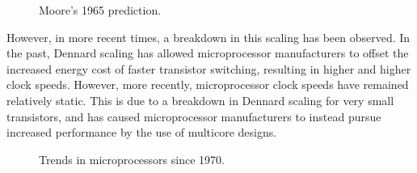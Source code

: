 \documentclass{UoYCSproject}
\begin{document}
\begin{figure}[h]
\caption{Moore's 1965 prediction. \cite{moore}}
\end{figure}

However, in more recent times, a breakdown in this scaling has been observed. In the past, Dennard scaling has allowed
microprocessor manufacturers to offset the increased energy cost of faster transistor switching, resulting in higher
and higher clock speeds. However, more recently, microprocessor clock speeds have remained relatively static. This is
due to a breakdown in Dennard scaling for very small transistors, and has caused microprocessor manufacturers to instead
pursue increased performance by the use of multicore designs.

\begin{figure}[h]
\caption{Trends in microprocessors since 1970. \cite{karlrupp}}
\end{figure}
\end{document}
